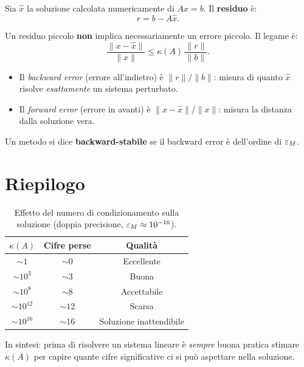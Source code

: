 Sia $\hat{x}$ la soluzione calcolata numericamente di $Ax = b$. Il
\textbf{residuo} è:
\begin{equation}
  r = b - A\hat{x}.
  \label{eq:residuo}
\end{equation}

Un residuo piccolo \textbf{non} implica necessariamente un errore piccolo. Il legame
è:
\begin{equation}
  \frac{\|x - \hat{x}\|}{\|x\|} \leq \kappa(A)\,\frac{\|r\|}{\|b\|}.
  \label{eq:residuo_errore}
\end{equation}

\begin{remark}
\begin{itemize}
  \item Il \emph{backward error} (errore all'indietro) è $\|r\|/\|b\|$: misura di
        quanto $\hat{x}$ risolve \emph{esattamente} un sistema perturbato.
  \item Il \emph{forward error} (errore in avanti) è $\|x - \hat{x}\|/\|x\|$:
        misura la distanza dalla soluzione vera.
\end{itemize}
Un metodo si dice \textbf{backward-stabile} se il backward error è dell'ordine di
$\varepsilon_M$.
\end{remark}

\section{Riepilogo}
\label{sec:riepilogo_cond}

\begin{table}[htbp]
  \centering
  \caption{Effetto del numero di condizionamento sulla soluzione (doppia precisione,
           $\varepsilon_M \approx 10^{-16}$).}
  \label{tab:condizionamento}
  \begin{tabular}{ccc}
    \toprule
    $\kappa(A)$ & Cifre perse & Qualità \\
    \midrule
    $\sim 1$       & $\sim 0$  & Eccellente \\
    $\sim 10^3$    & $\sim 3$  & Buona \\
    $\sim 10^8$    & $\sim 8$  & Accettabile \\
    $\sim 10^{12}$ & $\sim 12$ & Scarsa \\
    $\sim 10^{16}$ & $\sim 16$ & Soluzione inattendibile \\
    \bottomrule
  \end{tabular}
\end{table}

In sintesi: prima di risolvere un sistema lineare è \emph{sempre} buona pratica
stimare $\kappa(A)$ per capire quante cifre significative ci si può aspettare nella
soluzione.
